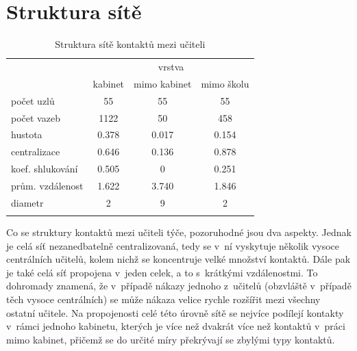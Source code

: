 \section*{Struktura sítě} 

\begin{table}
    \centering
    \caption{Struktura sítě kontaktů mezi učiteli}
\begin{tabular}{lccc}
\hline
                 & \multicolumn{3}{c}{vrstva}                                                                      \\ 
                 & \multicolumn{1}{l}{kabinet} & \multicolumn{1}{l}{mimo kabinet} & \multicolumn{1}{l}{mimo školu} \\ \hline
počet uzlů       & 55                          & 55                               & 55                             \\
počet vazeb      & 1122                        & 50                               & 458                            \\
hustota          & 0.378                       & 0.017                            & 0.154                          \\
centralizace     & 0.646                       & 0.136                            & 0.878                          \\
koef. shlukování & 0.505                       & 0                                & 0.251                          \\
prům. vzdálenost & 1.622                       & 3.740                            & 1.846                          \\
diametr          & 2                           & 9                                & 2                              \\ \hline
\label{table:100-teachers}
\end{tabular}
\end{table}

Co se struktury kontaktů mezi učiteli týče, pozoruhodné jsou dva aspekty. Jednak je celá síť nezanedbatelně centralizovaná, tedy se v~ní vyskytuje několik vysoce centrálních učitelů, kolem nichž se koncentruje velké množství kontaktů. Dále pak je také celá síť propojena v~jeden celek, a to s~krátkými vzdálenostmi. To dohromady znamená, že v~případě nákazy jednoho z~učitelů (obzvláště v~případě těch vysoce centrálních) se může nákaza velice rychle rozšířit mezi všechny ostatní učitele. Na propojenosti celé této úrovně sítě se nejvíce podílejí kontakty v~rámci jednoho kabinetu, kterých je více než dvakrát více než kontaktů v~práci mimo kabinet, přičemž se do určité míry překrývají se zbylými typy kontaktů. 

